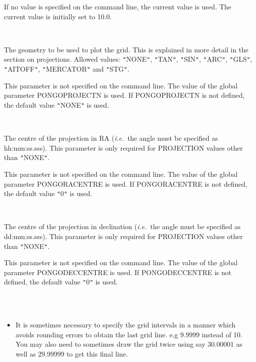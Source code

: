 \documentclass[twoside,11pt]{article}
\renewcommand{\_}{\texttt{\symbol{95}}}
\newcommand{\ie}{{\em i.e.\ }}
\newcommand{\sstsubsection}[1]{ \item[{#1}] \mbox{} \\}
\newcommand{\sstnotes}[1]{\item[Notes:] \mbox{} \\[1.3ex] #1}
\newcommand{\sstitemlist}[1]{
  \mbox{} \\
  \vspace{-3.5ex}
  \begin{itemize}
     #1
  \end{itemize}
}
\newcommand{\sstitem}{\item}
\newcommand{\sstsubsection}[1]{\item[{#1}]}
\newcommand{\sstnotes}[1]{\item[Notes:] #1 }
\newcommand{\sstitemlist}[1]{
      \begin{itemize}
         #1
      \end{itemize}
      \\
   }
\newcommand{\sstitem}{\item}
\begin{document}
{{{         If no value is specified on the command line, the current
         value is used. The current value is initially set to 10.0.
      }
      \sstsubsection{
         PROJECTION = \_LITERAL (Read)
      }{
         The geometry to be used to plot the grid.  This is explained
         in more detail in the section on projections.  Allowed values:
         {\tt "}NONE{\tt "}, {\tt "}TAN{\tt "}, {\tt "}SIN{\tt "}, {\tt "}ARC{\tt "}, {\tt "}GLS{\tt "}, {\tt "}AITOFF{\tt "}, {\tt "}MERCATOR{\tt "} and
         {\tt "}STG{\tt "}.

         This parameter is not specified on the command line. The value
         of the global parameter PONGO\_PROJECTN is used. If
         PONGO\_PROJECTN is not defined, the default value {\tt "}NONE{\tt "} is
         used.
      }
      \sstsubsection{
         RACENTRE = \_LITERAL (Read)
      }{
         The centre of the projection in RA (\ie the angle must be
         specified as hh:mm:ss.sss). This parameter is only required for
         PROJECTION values other than {\tt "}NONE{\tt "}.

          This parameter is not specified on the command line. The
          value of the global parameter PONGO\_RACENTRE is used. If
          PONGO\_RACENTRE is not defined, the default value {\tt "}0{\tt "} is used.
      }
      \sstsubsection{
         DECCENTRE = \_LITERAL (Read)
      }{
         The centre of the projection in declination (\ie the angle
         must be specified as dd:mm:ss.sss). This parameter is only
         required for PROJECTION values other than {\tt "}NONE{\tt "}.

         This parameter is not specified on the command line. The value
         of the global parameter PONGO\_DECCENTRE is used. If
         PONGO\_DECCENTRE is not defined, the default value {\tt "}0{\tt "} is used.
      }
   }
   \sstnotes{
      \sstitemlist{

         \sstitem
         It is sometimes necessary to specify the grid intervals in a
         manner which avoids rounding errors to obtain the last grid line.
         e.g 9.9999 instead of 10. You may also need to sometimes draw
         the grid twice using say 30.00001 as well as 29.99999 to get
         this final line.

      }
   }
}
\end{document}
